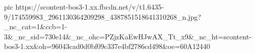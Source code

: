  
 
 
 
 


\ifcmt
  pic https://scontent-bos3-1.xx.fbcdn.net/v/t1.6435-9/174559983_2961130364209298_4387851518641310268_n.jpg?_nc_cat=1&ccb=1-3&_nc_sid=730e14&_nc_ohc=PZjzKaEwHJwAX_Tt_x9&_nc_ht=scontent-bos3-1.xx&oh=96043cad0d0bf09c337e4bf2786cd498&oe=60A12440
\fi

